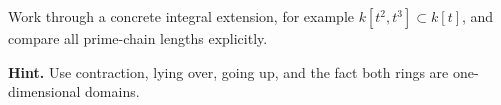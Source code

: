 \begin{problem}\label{chal:vi29-04}
Work through a concrete integral extension, for example $k[t^2,t^3]\subset k[t]$, and compare all prime-chain lengths explicitly.

\textbf{Hint.} Use contraction, lying over, going up, and the fact both rings are one-dimensional domains.
\end{problem}
